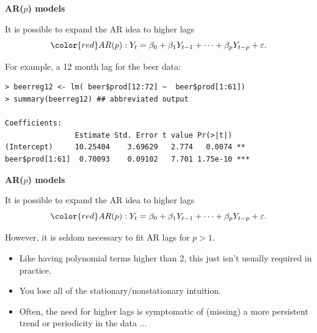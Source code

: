 \documentclass[12pt,xcolor=svgnames]{beamer}
\newcommand{\rd}{\color{red}}
\newcommand{\bl}{\color{blue}}
\newcommand{\theme}{\color{FireBrick}}
\newcommand{\sk}{\vspace{.4cm}}
\newcommand{\chap}[1]{{\theme \Large \bf #1} \sk}
\begin{document}
\begin{frame}[fragile]
\chap{AR($p$) models}

It is possible to expand the AR idea to higher lags
\[
\rd AR(p): Y_t = \beta_0 + \beta_1Y_{t-1} + \cdots + \beta_pY_{t-p} + \varepsilon.
\]

\vspace{-0.5cm}
For example, a 12 month lag for the beer data:
{\bl \footnotesize
\begin{verbatim}
> beerreg12 <- lm( beer$prod[12:72] ~  beer$prod[1:61])
> summary(beerreg12) ## abbreviated output

Coefficients:
                Estimate Std. Error t value Pr(>|t|)    
(Intercept)     10.25404    3.69629   2.774   0.0074 ** 
beer$prod[1:61]  0.70093    0.09102   7.701 1.75e-10 ***
\end{verbatim}
}
\end{frame}


\begin{frame}
\chap{AR($p$) models}

It is possible to expand the AR idea to higher lags
\[
\rd AR(p): Y_t = \beta_0 + \beta_1Y_{t-1} + \cdots + \beta_pY_{t-p} + \varepsilon.
\]

\vspace{-0.5cm}
However, it is seldom necessary to fit AR lags for $p>1$.
\begin{itemize}
\item Like having polynomial terms higher than 2, this just isn't usually
required in practice.
\item You lose all of the stationary/nonstationary
intuition.
\item Often, the need for higher lags is symptomatic of (missing) a more
persistent trend or periodicity in the data ...
\end{itemize}
\end{frame}
\end{document}
